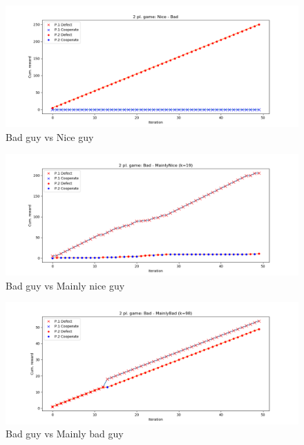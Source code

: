 \documentclass[journal,a4paper,10pt,twoside]{IEEEtran}
\begin{document}
\begin{figure}[ht]
    \centering
    \includegraphics[width=1\columnwidth]{../img/ipd2p-rewards-Nice-Bad.png}
    \caption{Bad guy vs Nice guy}
    \label{fig:badvsnice}
\end{figure}

\begin{figure}[ht]
    \centering
    \includegraphics[width=1\columnwidth]{../img/ipd2p-rewards-Bad-MainlyNice (k=19).png}
    \caption{Bad guy vs Mainly nice guy}
    \label{fig:badvsmainlynice}
\end{figure}

\begin{figure}[ht]
    \centering
    \includegraphics[width=1\columnwidth]{../img/ipd2p-rewards-Bad-MainlyBad (k=98).png}
    \caption{Bad guy vs Mainly bad guy}
    \label{fig:badvsmainlybad}
\end{figure}
\end{document}
